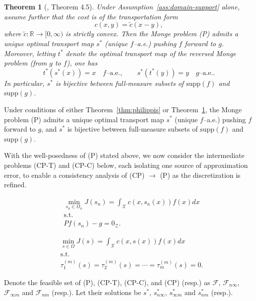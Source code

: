 \documentclass[12pt,leqno]{amsart}
\newtheorem{theorem}{Theorem}
\begin{document}
\begin{theorem}[\cite{GangboMcCann1996}, Theorem 4.5]\label{thm:gangbo-mccann}
Under Assumption~\ref{ass:domain-support} alone, assume further that the cost is of the transportation form
\[
c(x,y)=\tilde c(x-y),
\]
where $\tilde c:\mathbb R\to[0,\infty)$ is strictly convex. Then the Monge problem (P) admits a unique optimal transport map
$s^*$ (unique $f$--a.e.) pushing $f$ forward to $g$. Moreover, letting $t^*$ denote the optimal transport map of the reversed Monge problem
(from $g$ to $f$), one has
\[
t^*(s^*(x)) = x \quad f\text{--a.e.}, 
\qquad 
s^*(t^*(y)) = y \quad g\text{--a.e.}.
\]
In particular, $s^*$ is bijective between full-measure subsets of $\mathrm{supp}(f)$ and $\mathrm{supp}(g)$.
\end{theorem}

Under conditions of either Theorem~\ref{thm:philippis} or Theorem~\ref{thm:gangbo-mccann}, the Monge problem (P) admits a unique optimal transport map $s^*$ (unique $f$--a.e.) pushing $f$ forward to $g$,
and $s^*$ is bijective between full-measure subsets of $\mathrm{supp}(f)$ and $\mathrm{supp}(g)$.

With the well-posedness of (P) stated above,
we now consider the intermediate problems (CP-T) and (CP-C) below, each isolating one source of approximation error, to enable a consistency analysis of (CP) $\to$ (P) as the discretization is refined. 

\begin{align*}
    &\min_{s_n \in\Omega_n} J(s_n)=\int_{\mathcal{X}} c(x, s_n(x)) f(x)dx \tag{CP-T}\\
    &\text{s.t.} \\
    & Pf(s_n)-g =0_{\mathcal{Z}}.
\end{align*}

\begin{align*}
    &\min_{s\in\Omega} J(s)=\int_{\mathcal{X}} c(x,s(x))f(x)dx \tag{CP-C}\\
    &\text{s.t.} \\
    & \tau^{(m)}_1(s) = \tau^{(m)}_2(s) =\cdots=\tau^{(m)}_m(s) = 0.
\end{align*}

Denote the feasible set of (P), (CP-T), (CP-C), and (CP) (resp.) as $\mathcal{F}$, $\mathcal{F}_{n\infty}$, $\mathcal{F}_{\infty m}$ and $\mathcal{F}_{nm}$ (resp.). 
Let their solutions be $s^*$, $s_{n\infty}^*$, $s_{\infty m}^*$ and $s_{nm}^*$ (resp.).
\end{document}
